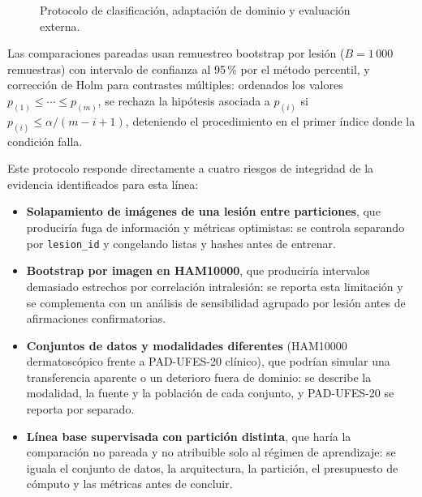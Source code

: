 \begin{figure}[!htbp]
\caption{Protocolo de clasificación, adaptación de dominio y evaluación externa.}
\label{fig:protocolo-evaluacion}
\centering


\par\smallskip
\begingroup\footnotesize\singlespacing\raggedright
\par{}
\par\endgroup
\end{figure}

 Las comparaciones pareadas usan remuestreo bootstrap por lesión ($B=1\,000$ remuestras) con intervalo de confianza al 95\,\% por el método percentil, y corrección de Holm para contrastes múltiples: ordenados los valores $p_{(1)}\leq\cdots\leq p_{(m)}$, se rechaza la hipótesis asociada a $p_{(i)}$ si $p_{(i)}\leq \alpha/(m-i+1)$, deteniendo el procedimiento en el primer índice donde la condición falla.

Este protocolo responde directamente a cuatro riesgos de integridad de la evidencia identificados para esta línea:
\begin{itemize}
 \item \textbf{Solapamiento de imágenes de una lesión entre particiones}, que produciría fuga de información y métricas optimistas: se controla separando por \texttt{lesion\_id} y congelando listas y hashes antes de entrenar.
 \item \textbf{Bootstrap por imagen en HAM10000}, que produciría intervalos demasiado estrechos por correlación intralesión: se reporta esta limitación y se complementa con un análisis de sensibilidad agrupado por lesión antes de afirmaciones confirmatorias.
 \item \textbf{Conjuntos de datos y modalidades diferentes} (HAM10000 dermatoscópico frente a PAD-UFES-20 clínico), que podrían simular una transferencia aparente o un deterioro fuera de dominio: se describe la modalidad, la fuente y la población de cada conjunto, y PAD-UFES-20 se reporta por separado.
 \item \textbf{Línea base supervisada con partición distinta}, que haría la comparación no pareada y no atribuible solo al régimen de aprendizaje: se iguala el conjunto de datos, la arquitectura, la partición, el presupuesto de cómputo y las métricas antes de concluir.
\end{itemize}

